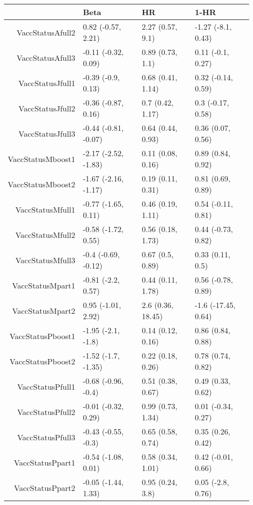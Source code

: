 \begin{table}[ht]
\centering
\begin{tabular}{rlll}
  \hline
 & Beta & HR & 1-HR \\ 
  \hline
VaccStatusAfull2 & 0.82 (-0.57, 2.21) & 2.27 (0.57, 9.1) & -1.27 (-8.1, 0.43) \\ 
  VaccStatusAfull3 & -0.11 (-0.32, 0.09) & 0.89 (0.73, 1.1) & 0.11 (-0.1, 0.27) \\ 
  VaccStatusJfull1 & -0.39 (-0.9, 0.13) & 0.68 (0.41, 1.14) & 0.32 (-0.14, 0.59) \\ 
  VaccStatusJfull2 & -0.36 (-0.87, 0.16) & 0.7 (0.42, 1.17) & 0.3 (-0.17, 0.58) \\ 
  VaccStatusJfull3 & -0.44 (-0.81, -0.07) & 0.64 (0.44, 0.93) & 0.36 (0.07, 0.56) \\ 
  VaccStatusMboost1 & -2.17 (-2.52, -1.83) & 0.11 (0.08, 0.16) & 0.89 (0.84, 0.92) \\ 
  VaccStatusMboost2 & -1.67 (-2.16, -1.17) & 0.19 (0.11, 0.31) & 0.81 (0.69, 0.89) \\ 
  VaccStatusMfull1 & -0.77 (-1.65, 0.11) & 0.46 (0.19, 1.11) & 0.54 (-0.11, 0.81) \\ 
  VaccStatusMfull2 & -0.58 (-1.72, 0.55) & 0.56 (0.18, 1.73) & 0.44 (-0.73, 0.82) \\ 
  VaccStatusMfull3 & -0.4 (-0.69, -0.12) & 0.67 (0.5, 0.89) & 0.33 (0.11, 0.5) \\ 
  VaccStatusMpart1 & -0.81 (-2.2, 0.57) & 0.44 (0.11, 1.78) & 0.56 (-0.78, 0.89) \\ 
  VaccStatusMpart2 & 0.95 (-1.01, 2.92) & 2.6 (0.36, 18.45) & -1.6 (-17.45, 0.64) \\ 
  VaccStatusPboost1 & -1.95 (-2.1, -1.8) & 0.14 (0.12, 0.16) & 0.86 (0.84, 0.88) \\ 
  VaccStatusPboost2 & -1.52 (-1.7, -1.35) & 0.22 (0.18, 0.26) & 0.78 (0.74, 0.82) \\ 
  VaccStatusPfull1 & -0.68 (-0.96, -0.4) & 0.51 (0.38, 0.67) & 0.49 (0.33, 0.62) \\ 
  VaccStatusPfull2 & -0.01 (-0.32, 0.29) & 0.99 (0.73, 1.34) & 0.01 (-0.34, 0.27) \\ 
  VaccStatusPfull3 & -0.43 (-0.55, -0.3) & 0.65 (0.58, 0.74) & 0.35 (0.26, 0.42) \\ 
  VaccStatusPpart1 & -0.54 (-1.08, 0.01) & 0.58 (0.34, 1.01) & 0.42 (-0.01, 0.66) \\ 
  VaccStatusPpart2 & -0.05 (-1.44, 1.33) & 0.95 (0.24, 3.8) & 0.05 (-2.8, 0.76) \\ 

\end{tabular}
\end{table}
